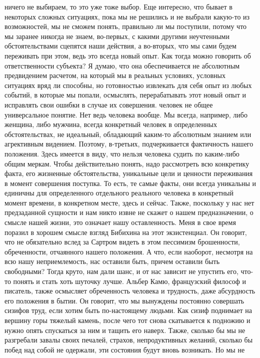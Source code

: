 ничего не выбираем, то это уже тоже выбор. Еще интересно, что бывает в некоторых
сложных ситуациях, пока мы не решились и не выбрали какую-то из возможностей, мы
не сможем понять, правильно ли мы поступили, потому что мы заранее никогда не
знаем, во-первых, с какими другими неучтенными обстоятельствами сцепятся наши
действия, а во-вторых, что мы сами будем переживать при этом, ведь это всегда
новый опыт. Как тогда можно говорить об ответственности субъекта? Я думаю, что
она обеспечивается не абсолютным предвидением расчетом, на который мы в реальных
условиях, условных ситуациях вряд ли способны, но готовностью извлекать для себя
опыт из любых событий, в которые мы попали, осмыслять, перерабатывать этот новый
опыт и исправлять свои ошибки в случае их совершения. человек не общее
универсальное понятие. Нет ведь человека вообще. Мы всегда, например, либо
женщина, либо мужчина, всегда конкретный человек в определенных обстоятельствах,
не идеальный, обладающий каким-то абсолютным знанием или агрективным видением.
Поэтому, в-третьих, подчеркивается фактичность нашего положения. Здесь имеется в
виду, что нельзя человека судить по каким-либо общим меркам. Чтобы действительно
понять, надо рассмотреть всю конкретику факта, его жизненные обстоятельства,
уникальные цели и ценности переживания в момент совершения поступка. То есть, те
самые факты, они всегда уникальны и единичны для определенного отдельного
реального человека в конкретный момент времени, в конкретном месте, здесь и
сейчас. Также, поскольку у нас нет предзаданной сущности и нам никто извне не
скажет о нашем предназначении, о смысле нашей жизни, это означает нашу
оставленность. Меня в свое время поразил в хорошем смысле взгляд Бибихина на
этот экзистенциал. Он говорит, что не обязательно вслед за Сартром видеть в этом
пессимизм брошенности, обреченности, отчаянного нашего положения. А что, если
наоборот, несмотря на всю нашу неприемлемость, нас оставили быть, причем
оставили быть свободными? Тогда круто, нам дали шанс, и от нас зависит не
упустить его, что-то понять и стать хоть шуточку лучше. Альбер Камю, французский
философ и писатель, также осмысляет обреченность человека и трудность, даже
абсурдность его положения в бытии. Он говорит, что мы вынуждены постоянно
совершать сизифов труд, если хотим быть по-настоящему людьми. Как сизиф
поднимает на вершину горы тяжелый камень, после чего тот снова скатывается к
подножию и нужно опять спускаться за ним и тащить его наверх. Также, сколько бы
мы не разгребали завалы своих печалей, страхов, непродуктивных желаний, сколько
бы побед над собой не одержали, эти состояния будут вновь возникать. Но мы не
